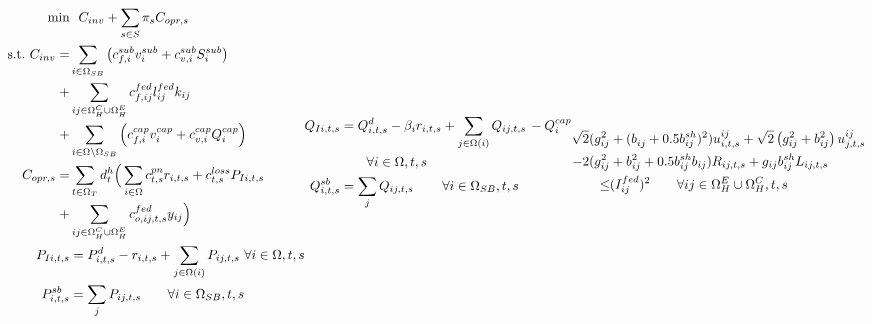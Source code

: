 \documentclass[journal]{IEEEtran}
\theoremstyle{remark}
\begin{document}
\begin{subequations}
\begin{align}
\min &  \ \ {C_{inv}} + \sum\limits_{s \in S} {{\pi _s}} {C_{opr,s}} \label{eq_obj}\\
\mbox{s.t.} \ {C_{inv}} =& \sum\limits_{i \in {\Omega _{SB}}} {\left( {c_{f,i}^{sub}v_i^{sub} + c_{v,i}^{sub}S_i^{sub}} \right)}  \\
+& \sum\limits_{ij \in \Omega _H^C \cup \Omega _H^E} c_{f,ij}^{fed}l_{ij}^{fed}{k_{ij}} \nonumber\\
+ & \sum\limits_{i \in \Omega \backslash {\Omega _{SB}}} {\left( {c_{f,i}^{cap}v_i^{cap} + c_{v,i}^{cap}Q_i^{cap}} \right)} \nonumber \\
 \ \ {C_{opr,s}} =& \sum\limits_{t \in {\Omega _T}} {d_t^h}\Big(\sum\limits_{i \in \Omega} {c_{t,s}^{pn} r_{i,t,s}+c_{t,s}^{loss}{P_{Ii,t,s}}} \nonumber \\
 + & \sum\limits_{ij \in \Omega _H^C \cup \Omega _H^E} {c_{o,ij,t,s}^{fed}{y_{ij}}}\Big)  \label{eq_sce_opt}\\
 P_{Ii,t,s} & = P_{i,t,s}^d - r_{i,t,s} + \sum_{j \in \Omega (i)} {{P_{ij,t,s}}}  \,\,\forall i \in \Omega ,t,s \label{eq_a2}\\
P_{i,t,s}^{sb} &= \sum\limits_j {{P_{ij,t,s}}} \qquad\forall i \in {\Omega _{SB}},t,s \label{eq_a3}
\end{align}
\begin{align}
Q_{Ii,t,s}  &= Q_{i,t,s}^d - \beta_i r_{i,t,s} + \sum\limits_{j \in \Omega (i)} Q_{ij,t,s} \, - Q_i^{cap}  \nonumber \\& \qquad \forall i \in \Omega ,t,s
\label{eq_a4}\\
Q_{i,t,s}^{sb} &= \sum\limits_j {{Q_{ij,t,s}}} \, \qquad\forall i \in {\Omega _{SB}},t,s \label{eq_a5}
\end{align}
\begin{align}
\noindent \sqrt 2 ( g_{ij}^2 & + (b_{ij}^{} + 0.5b_{ij}^{sh})^2) u_{i,t,s}^{ij} + \sqrt 2 \left( {g_{ij}^2 + b_{ij}^2} \right)u_{j,t,s}^{ij} \nonumber\\
- 2( g_{ij}^2 & + b_{ij}^2 + 0.5b_{ij}^{sh}b_{ij}) {R_{ij,t,s}} + g_{ij}b_{ij}^{sh}{L_{ij,t,s}} \nonumber\\
\le & (I_{ij}^{fed})^2 \qquad \forall ij \in \Omega _H^E \cup \Omega _H^C,t,s  \label{eq_a6}\\

\end{align}
\end{subequations}
\end{document}
